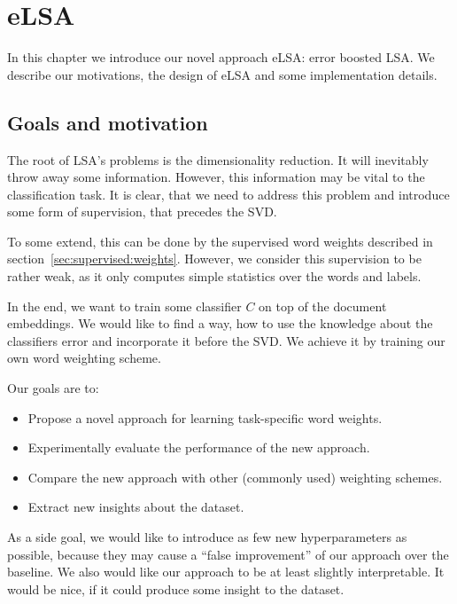 \chapter{eLSA}

In this chapter we introduce our novel approach eLSA: error boosted LSA.
We describe our motivations, the design of eLSA and some implementation details.

\section{Goals and motivation}

    The root of LSA's problems is the dimensionality reduction.
    It will inevitably throw away some information. 
    However, this information may be vital to the classification task. 
    It is clear, that we need to address this problem and introduce some form of supervision, that precedes the SVD.
    
    To some extend, this can be done by the supervised word weights described in section~\ref{sec:supervised:weights}.
    However, we consider this supervision to be rather weak, as it only computes simple statistics over the words and labels.
    
    In the end, we want to train some classifier $C$ on top of the document embeddings.
    We would like to find a way, how to use the knowledge about the classifiers error and incorporate it before the SVD.
    We achieve it by training our own word weighting scheme. 
    
    Our goals are to:
    \begin{itemize}
        \item Propose a novel approach for learning task-specific word weights.
        \item Experimentally evaluate the performance of the new approach.
        \item Compare the new approach with other (commonly used) weighting schemes. 
        \item Extract new insights about the dataset.
    \end{itemize}
    
    As a side goal, we would like to introduce as few new hyperparameters as possible,
    because they may cause a ``false improvement'' of our approach over the baseline.
    We also would like our approach to be at least slightly interpretable.
    It would be nice, if it could produce some insight to the dataset.
    
